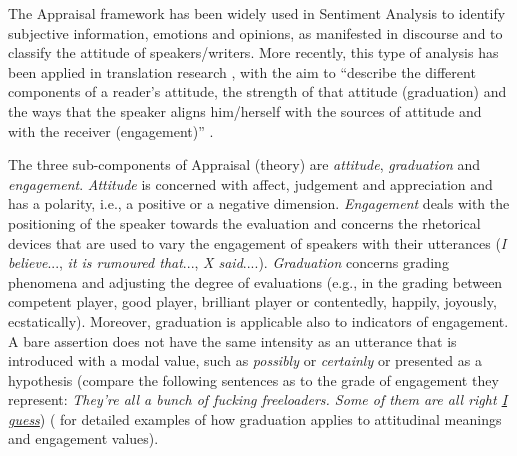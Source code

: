 \documentclass[output=paper]{LSP/langsci}
\begin{document}
The Appraisal framework has been widely used in Sentiment Analysis to identify subjective information, emotions and opinions, as manifested in discourse \citep[see e.g.][]{Whitelaw2005,Taboada2004,Asher2009} and to classify the attitude of speakers/writers. More recently, this type of analysis has been applied in translation research \citep[see the work reported in][42-79]{Munday2012}, with the aim to “describe the different components of a reader's attitude, the strength of that attitude (graduation) and the ways that the speaker aligns him/herself with the sources of attitude and with the receiver (engagement)” \citep[2]{Munday2012}.

The three sub-components of Appraisal (theory) are \textit{attitude}, \textit{graduation} and \textit{engagement}. \textit{Attitude} is concerned with affect, judgement and appreciation and has a polarity, i.e., a positive or a negative dimension. \textit{Engagement} deals with the positioning of the speaker towards the evaluation and concerns the rhetorical devices that are used to vary the engagement of speakers with their utterances (\textit{I believe}..., \textit{it is rumoured that}..., \textit{X said}....). \textit{Graduation} concerns grading phenomena and adjusting the degree of evaluations (e.g., in the grading between competent player, good player, brilliant player or contentedly, happily, joyously, ecstatically). Moreover, graduation is applicable also to indicators of engagement. A bare assertion does not have the same intensity as an utterance that is introduced with a modal value, such as \textit{possibly} or \textit{certainly} or presented as a hypothesis (compare the following sentences as to the grade of engagement they represent: \textit{They're all a bunch of fucking freeloaders. Some of them are all right \ul{I guess}}) (\citealt[see][136]{MartinWhite2005} for detailed examples of how graduation applies to attitudinal meanings and engagement values).
\end{document}
